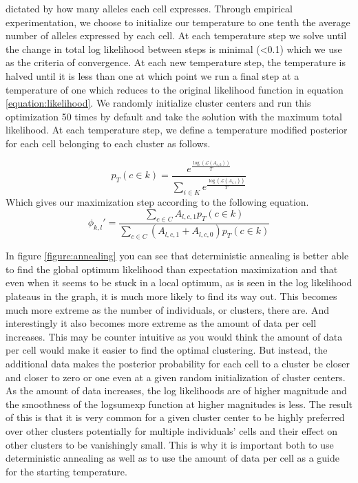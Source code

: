 {dictated by how many alleles each cell expresses. Through empirical experimentation, we choose to initialize our temperature to one tenth the average number of alleles expressed by each cell. At each temperature step we solve until the change in total log likelihood between steps is minimal (<0.1) which we use as the criteria of convergence. At each new temperature step, the temperature is halved until it is less than one at which point we run a final step at a temperature of one which reduces to the original likelihood function in equation \ref{equation:likelihood}.  We randomly initialize cluster centers and run this optimization 50 times by default and take the solution with the maximum total likelihood. At each temperature step, we define a temperature modified posterior for each cell belonging to each cluster as follows.
}

\begin{equation}
p_T(c \in k) =  \frac{e^{\frac{\log(\mathcal{L}(A_{c,k}))}{T}}}{\sum_{i \in K} e^{\frac{\log(\mathcal{L}(A_{c,i}))}{T}}}
\end{equation}
Which gives our maximization step according to the following equation.
\begin{equation}
\phi_{k,l}' = \frac{\sum_{c \in C} A_{l,c,1} p_T(c \in k)}{\sum_{c \in C}(A_{l,c,1} + A_{l,c,0})p_T(c \in k)}
\end{equation}

\par{
In figure \ref{figure:annealing} you can see that deterministic annealing is better able to find the global optimum likelihood than expectation maximization and that even when it seems to be stuck in a local optimum, as is seen in the log likelihood plateaus in the graph, it is much more likely to find its way out. This becomes much more extreme as the number of individuals, or clusters, there are. And interestingly it also becomes more extreme as the amount of data per cell increases. This may be counter intuitive as you would think the amount of data per cell would make it easier to find the optimal clustering. But instead, the additional data makes the posterior probability for each cell to a cluster be closer and closer to zero or one even at a given random initialization of cluster centers. As the amount of data increases, the log likelihoods are of higher magnitude and the smoothness of the logsumexp function at higher magnitudes is less. The result of this is that it is very common for a given cluster center to be highly preferred over other clusters potentially for multiple individuals' cells and their effect on other clusters to be vanishingly small. This is why it is important both to use deterministic annealing as well as to use the amount of data per cell as a guide for the starting temperature.
}


